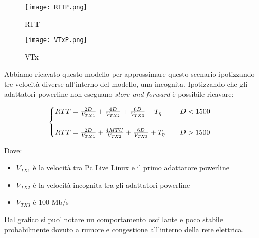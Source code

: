\documentclass[../lab2.tex]{subfiles}
\begin{document}
    
    \begin{figure}[!htb]
        \begin{minipage}{0.48\textwidth}
            \centering
            \texttt{[image: RTTP.png]}
            \vspace{-20pt}
            \caption{RTT}\label{RTTP}
        \end{minipage}\hfill
        \begin{minipage}{0.48\textwidth}
            \centering
            \texttt{[image: VTxP.png]}
            \vspace{-20pt}
            \caption{VTx}\label{VTxP}
        \end{minipage}
    \end{figure}

    Abbiamo ricavato questo modello per approssimare questo scenario ipotizzando 
    tre velocità diverse all'interno del modello, una incognita. 
    Ipotizzando che gli adattatori powerline non eseguano \textit{store and forward} è
    possibile ricavare:

    \begin{equation}
        \centering
        \begin{cases}
            RTT = \frac{2D}{V_{TX1}} +\frac{4D}{V_{TX2}} +\frac{6D}{V_{TX3}} + T_\eta  \qquad \, \, \, D < 1500 \\
            \\
            RTT = \frac{2D}{V_{TX1}} +\frac{4MTU}{V_{TX2}} +\frac{6D}{V_{TX3}} + T_\eta  \qquad D > 1500
        \end{cases}
    \end{equation}

    Dove:

    \begin{itemize}
        \item $V_{TX1}$ è la velocità tra Pc Live Linux e il primo adattatore powerline \\
        \item $V_{TX2}$ è la velocità incognita tra gli adattatori powerline \\ 
        \item $V_{TX3}$ è 100 Mb/s
    \end{itemize}

    Dal grafico si puo' notare un comportamento oscillante e poco stabile probabilmente
    dovuto a rumore e congestione all'interno della rete elettrica.
\end{document}
